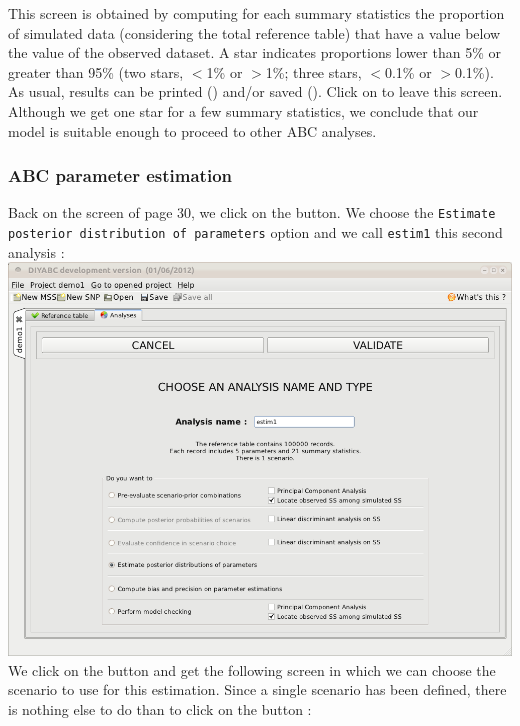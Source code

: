 This screen is obtained by computing for each summary statistics the
proportion of simulated data (considering the total reference table)
that have a value below the value of the observed dataset. A star
indicates proportions lower than 5\% or greater than 95\% (two stars,
$<$1\% or $>$1\%; three stars, $<$0.1\% or $>$0.1\%).\\


As usual, results can be printed () and/or
saved (). Click on  to leave
this screen.\\


Although we get one star for a few summary statistics, we conclude
that our model is suitable enough to proceed to other ABC analyses.


\subsubsection{ABC parameter estimation}

Back on the screen of page 30, we click on the  button. We choose the \texttt{Estimate posterior distribution
of parameters} option and we call \texttt{estim1} this second analysis
:\\


\includegraphics[scale=0.35]{gui_pictures/Capture-DIYABC-34} \\


We click on the  button and get the following
screen in which we can choose the scenario to use for this estimation.
Since a single scenario has been defined, there is nothing else to
do than to click on the  button : \\


